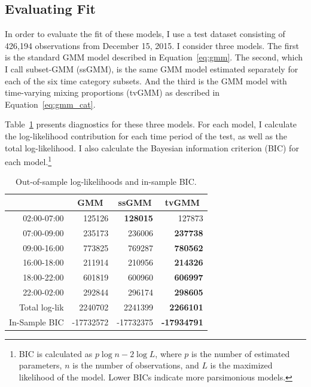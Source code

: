 \documentclass[12pt]{article}
\theoremstyle{definition}
\theoremstyle{algodesc}
\begin{document}
\subsection{Evaluating Fit}
In order to evaluate the fit of these models, I use a test dataset consisting of 426,194 observations from December 15, 2015. I consider three models. The first is the standard GMM model described in Equation~\ref{eq:gmm}. The second, which I call subset-GMM (ssGMM), is the same GMM model estimated separately for each of the six time category subsets. And the third is the GMM model with time-varying mixing proportions (tvGMM) as described in Equation~\ref{eq:gmm_cat}.

Table~\ref{tab:logliks} presents diagnostics for these three models. For each model, I calculate the log-likelihood contribution for each time period of the test, as well as the total log-likelihood. I also calculate the Bayesian information criterion (BIC) for each model.\footnote{BIC is calculated as $p \log n - 2 \log L$, where $p$ is the number of estimated parameters, $n$ is the number of observations, and $L$ is the maximized likelihood of the model. Lower BICs indicate more parsimonious models.}

\begin{table}[htb] \centering
\begin{tabular}{rrrr}
  \toprule
   & \multicolumn{1}{c}{GMM} & \multicolumn{1}{c}{ssGMM} & \multicolumn{1}{c}{tvGMM} \\
  \midrule
  02:00-07:00 &  125126 &  \textbf{128015} &  127873 \\
  07:00-09:00 &  235173 &  236006 &  \textbf{237738} \\
  09:00-16:00 &  773825 &  769287 &  \textbf{780562} \\
  16:00-18:00 &  211914 &  210956 &  \textbf{214326} \\
  18:00-22:00 &  601819 &  600960 &  \textbf{606997} \\
  22:00-02:00 &  292844 &  296174 &  \textbf{298605} \\
  \midrule
  Total log-lik &  2240702 &  2241399 &  \textbf{2266101} \\
  In-Sample BIC & -17732572 & -17732375 & \textbf{-17934791} \\
  \bottomrule
\end{tabular}
\caption{Out-of-sample log-likelihoods and in-sample BIC.}
\label{tab:logliks}
\end{table}
\end{document}
